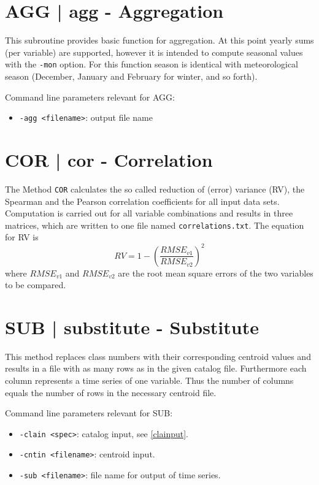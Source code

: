 \documentclass[12pt, oneside, a4paper, headsepline, plainheadsepline]{scrbook}
\begin{document}
\section{AGG | agg - Aggregation}
This subroutine provides basic function for aggregation. At this point yearly sums (per variable) are supported, however it is intended to compute seasonal values with the \verb+-mon+ option. For this function season is identical with meteorological season (December, January and February for winter, and so forth).

Command line parameters relevant for AGG:
\begin{itemize}
\item  \verb+-agg <filename>+: output file name
\end{itemize}
\section{COR | cor - Correlation}
The Method \verb+COR+ calculates the so called reduction of (error) variance (RV), the Spearman and the Pearson correlation coefficients for all input data sets. Computation is carried out for all variable combinations and results in three matrices, which are written to one file named \verb+correlations.txt+. The equation for RV is
\begin{equation}\label{eq:rv}
RV=1-\left(\frac{RMSE_{v1}}{RMSE_{v2}}\right)^2
\end{equation}
where $RMSE_{v1}$ and $RMSE_ {v2}$ are the root mean square errors of the two variables to be compared.
\section{SUB | substitute - Substitute}
This method replaces class numbers with their corresponding centroid values and results in a file with as many rows as in the given catalog file. Furthermore each column represents a time series of one variable. Thus the number of columns equals the number of rows in the necessary centroid file.

Command line parameters relevant for SUB:
\begin{itemize}
\item  \verb+-clain <spec>+:  catalog input, see \ref{clainput}.
\item  \verb+-cntin <filename>+:  centroid input.
\item  \verb+-sub <filename>+: file name for output of time series.
\end{itemize}
\end{document}
